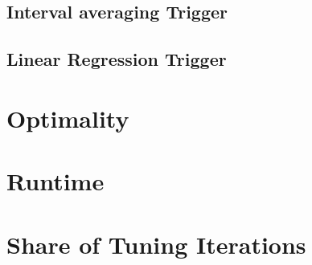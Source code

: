 \subsection{Interval averaging Trigger}
\subsection{Linear Regression Trigger}


\section{Optimality}
\section{Runtime}
\section{Share of Tuning Iterations}


